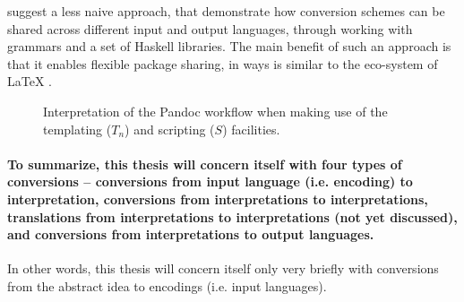 \documentclass{scrreprt}
\begin{document}
\citet{krijnen} suggest a less naive approach, that demonstrate how conversion schemes can be shared across different input and output languages, through working with grammars and a set of Haskell libraries. The main benefit of such an approach is that it enables flexible package sharing, in ways is similar to the eco-system of \LaTeX{} \citep{krijnen}.



\begin{figure}[h]
    \centering


    \caption{Interpretation of the Pandoc workflow when making use of the templating ($T_n$) and scripting ($S$) facilities.}
    \label{fig:interpretation-of-pandoc}
  \end{figure}



\paragraph{To summarize, this thesis will concern itself with four types of conversions -- conversions from input language (i.e. encoding) to interpretation, conversions from interpretations to interpretations, translations from interpretations to interpretations (not yet discussed), and conversions from interpretations to output languages.} In other words, this thesis will concern itself only very briefly with conversions from the abstract idea to encodings (i.e. input languages). 
\end{document}
